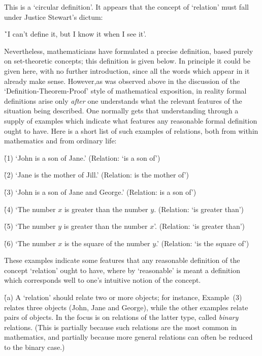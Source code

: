 \noindent This is a `circular definition'. It appears that the concept of `relation' must fall under Justice Stewart's dictum:

        \h `I can't define it, but I know it when I see it'.

\V

        Nevertheless, mathematicians have formulated a precise definition, based purely on set-theoretic concepts; this definition is given below.
    In principle it could be given here, with no further introduction, since all the words which appear in it already make sense.
    However,as was observed above in the discussion of the `Definition-Theorem-Proof' style of mathematical exposition,
    in reality formal definitions arise only {\em after} one understands what the relevant features of the situation being described.
    One normally gets that understanding through a supply of examples which indicate what features any reasonable formal definition ought to have.
    Here is a short list of such examples of relations, both from within mathematics and from ordinary life:

\V

       \h (1) `John is a son of Jane.' (Relation: `is a son of')

\VA

       \h (2) `Jane is the mother of Jill.' (Relation: is the mother of')

\VA

       \h (3) `John is a son of Jane and George.' (Relation: is a son of')

\VA

       \h (4) `The number $x$ is greater than the number $y$. (Relation: `is greater than')

\VA

       \h (5) `The number $y$ is greater than the number $x$'. (Relation: `is greater than')

\VA

       \h (6) `The number $x$ is the square of the number $y$.' (Relation: `is the square of')



\VA

        These examples indicate some features that any reasonable definition of the concept `relation' ought to have,
    where by `reasonable' is meant a definition which corresponds well to one's intuitive notion of the concept.

        \h (a) A `relation' should relate two or more objects; for instance, Example~(3) relates three objects (John, Jane and George),
    while the other examples relate pairs of objects. In {\TheseNotes} the focus is on relations of the latter type, called {\em binary} relations.
    (This is partially because such relations are the most common in mathematics,
    and partially because more general relations can often be reduced to the binary case.)

